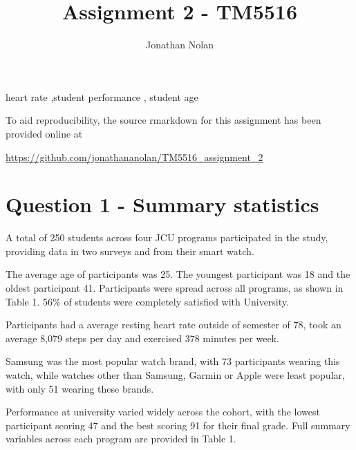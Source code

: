\documentclass[preprint, 3p,
authoryear]{elsarticle} %
\begin{document}
\begin{frontmatter}

  \title{Assignment 2 - TM5516}
    \author[James Cook University]{Jonathan Nolan%
  }
  
  \begin{abstract}
  
  \end{abstract}
    \begin{keyword}
    heart rate \sep student performance \sep 
    student age
  \end{keyword}
  
 \end{frontmatter}

To aid reproducibility, the source rmarkdown for this assignment has
been provided online at

\url{https://github.com/jonathananolan/TM5516_assignment_2}

\hypertarget{question-1---summary-statistics}{%
\section{Question 1 - Summary
statistics}\label{question-1---summary-statistics}}

A total of 250 students across four JCU programs participated in the
study, providing data in two surveys and from their smart watch.

The average age of participants was 25. The youngest participant was 18
and the oldest participant 41. Participants were spread across all
programs, as shown in Table 1. 56\% of students were completely
satisfied with University.

Participants had a average resting heart rate outside of semester of 78,
took an average 8,079 steps per day and exercised 378 minutes per week.

Samsung was the most popular watch brand, with 73 participants wearing
this watch, while watches other than Samsung, Garmin or Apple were least
popular, with only 51 wearing these brands.

Performance at university varied widely across the cohort, with the
lowest participant scoring 47 and the best scoring 91 for their final
grade. Full summary variables across each program are provided in Table
1.
\end{document}
